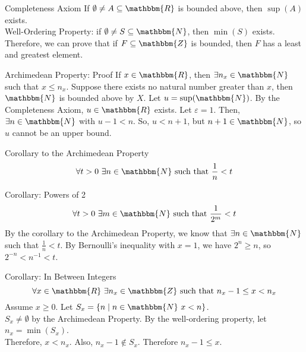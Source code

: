 \documentclass[10pt]{extarticle}
\newcommand{\N}{\mathbbm{N}}
\newcommand{\Z}{\mathbbm{Z}}
\newcommand{\R}{\mathbbm{R}}
\begin{document}
  \begin{problem}{Completeness Axiom}
    If $\emptyset\neq A\subseteq \R$ is bounded above, then $\sup(A)$ exists.\\

    Well-Ordering Property: if $\emptyset \neq S\subseteq \N$, then $\min(S)$ exists.\\

    Therefore, we can prove that if $F\subseteq \Z$ is bounded, then $F$ has a least and greatest element.\\

    \begin{problem}{Archimedean Property: Proof}
      If $x\in\R$, then $\exists n_x\in\N$ such that $x\leq n_x$.
      \tcblower
      Suppose there exists no natural number greater than $x$, then $\N$ is bounded above by $X$. Let $u = \sup(\N)$. By the Completeness Axiom, $u\in\R$ exists. Let $\varepsilon = 1$. Then, $\exists n\in\N$ with $u-1 < n$. So, $u < n+1$, but $n+1\in\N$, so $u$ cannot be an upper bound.
    \end{problem}
    \begin{problem}{Corollary to the Archimedean Property}
      \[
        \forall t > 0~\exists n\in\N \text{ such that } \frac{1}{n}<t
      \] 
    \end{problem}
    \begin{problem}{Corollary: Powers of 2}
      \[
        \forall t > 0~\exists m\in\N \text{ such that } \frac{1}{2^m} < t
      \] 
      \tcblower
      By the corollary to the Archimedean Property, we know that $\exists n\in \N$ such that $\frac{1}{n} < t$. By Bernoulli's inequality with $x = 1$, we have $2^n \geq n$, so $2^{-n} < n^{-1} < t$.
    \end{problem}
    \begin{problem}{Corollary: In Between Integers}
      \[
        \forall x\in\R~\exists n_x\in \Z \text{ such that } n_x-1 \leq x < n_x
      \] 
      \tcblower
      Assume $x \geq 0$. Let $S_x = \{n\mid n\in \N~x < n\}$.\\

      $S_x \neq \emptyset$ by the Archimedean Property. By the well-ordering property, let $n_x = \min(S_x)$.\\

      Therefore, $x < n_x$. Also, $n_x - 1 \notin S_x$. Therefore $n_x - 1 \leq x$.
    \end{problem}
  \end{problem}
\end{document}
